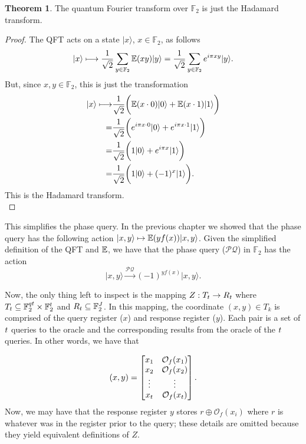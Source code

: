 \documentclass[12pt,twoside]{reedthesis}
\theoremstyle{definition}
\newtheorem{theorem}{Theorem}[chapter]
\newlength{\arrow}
\newcommand{\F}{\mathbb{F}}
\newcommand{\ket}[1]{\ensuremath{\lvert #1\rangle}\xspace}
\begin{document}
 
\begin{theorem} The quantum Fourier transform over $\F_2$ is just the Hadamard transform.
\end{theorem}

\begin{proof}
The QFT acts on a state $\ket{x}$, $x\in \F_2$, as follows
\begin{equation*}
\ket{x}  \longmapsto \frac{1}{\sqrt{2}}\sum_{y\in \F_2} \expf(xy)\ket{y}
=  \frac{1}{\sqrt{2}}\sum_{y\in \F_2} e^{i\pi xy}\ket{y}.
\end{equation*}
But, since $x,y \in \F_2$, this is just the transformation
\begin{align*}
\ket{x}  \longmapsto 
&\frac{1}{\sqrt{2}}\bigg( \expf(x\cdot 0)\ket{0} + \expf(x\cdot 1)\ket{1} \bigg) \\
 = &  \frac{1}{\sqrt{2}}\bigg( e^{i\pi x\cdot 0}\ket{0} + e^{i\pi x\cdot 1}\ket{1} \bigg) \\
 = & \frac{1}{\sqrt{2}}\bigg( 1\ket{0} + e^{i\pi x}\ket{1} \bigg) \\
 = & \frac{1}{\sqrt{2}}\bigg( 1\ket{0} + (-1)^x\ket{1} \bigg). 
\end{align*}
This is the Hadamard transform. \\
\end{proof}

This simplifies the phase query. In the previous chapter we showed that the phase query has the following action $\ket{x,y} \mapsto \expf(yf(x))\ket{x,y}$. Given the simplified definition of the QFT and $\mathbb{E}$, we have that the phase query ($\mathcal{PQ}$) in $\F_2$ has the action
\begin{equation}
\ket{x,y} \xrightarrow{\mathcal{PQ}} (-1)^{yf(x)} \ket{x,y}.
\end{equation}

Now, the only thing left to inspect is the mapping $Z: T_t \rightarrow R_t$ where $T_\numq \subseteq \F_2^{\numin \numq} \times \F_2^\numq$ and $R_\numq \subseteq \F_2^\srmexp$. In this mapping, the coordinate $(x,y) \in T_k$ is comprised of the query register ($x$) and response register ($y$). Each pair is a set of $t$ queries to the oracle and the corresponding results from the oracle of the $t$ queries. In other words, we have that

\begin{equation*}
(x, y) =
\begin{bmatrix}
x_1 & \mathcal{O}_f(x_1) \\
x_2 & \mathcal{O}_f(x_2)\\
\vdots & \vdots \\
x_t & \mathcal{O}_f(x_t)
\end{bmatrix}.
\end{equation*}
Now,  we may have that the response register $y$ stores $r \oplus \mathcal{O}_f(x_i)$  where $r$ is whatever was in the register prior to the query; these details are omitted because they yield equivalent definitions of $Z$.
\end{document}
